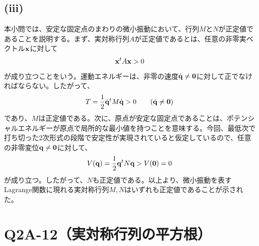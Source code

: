   
  \subsection*{(iii)}
  本小問では、安定な固定点のまわりの微小振動において、行列$M$と$N$が正定値であることを説明する。まず、実対称行列$A$が正定値であるとは、任意の非零実ベクトル$\boldsymbol{\mathrm{x}}$に対して
  \begin{align*}
    \boldsymbol{\mathrm{x}}^{t}A\boldsymbol{\mathrm{x}}>0
  \end{align*}
  が成り立つことをいう。運動エネルギーは、非零の速度$\dot{\boldsymbol{\mathrm{q}}}\neq\boldsymbol{\mathrm{0}}$に対して正でなければならない。したがって、
  \begin{align*}
    T=\frac{1}{2}\dot{\boldsymbol{\mathrm{q}}}^{t}M\dot{\boldsymbol{\mathrm{q}}}>0\qquad(\dot{\boldsymbol{\mathrm{q}}}\neq\boldsymbol{\mathrm{0}})
  \end{align*}
  であり、$M$は正定値である。次に、原点が安定な固定点であることは、ポテンシャルエネルギーが原点で局所的な最小値を持つことを意味する。今回、最低次で打ち切った2次形式の段階で安定性が実現されていると仮定しているので、任意の非零変位$\boldsymbol{\mathrm{q}}\neq\boldsymbol{\mathrm{0}}$に対して、
  \begin{align*}
    V(\boldsymbol{\mathrm{q}})=\frac{1}{2}\boldsymbol{\mathrm{q}}^{t}N\boldsymbol{\mathrm{q}}>V(\boldsymbol{\mathrm{0}})=0
  \end{align*}
  が成り立つ。したがって、$N$も正定値である。以上より、微小振動を表すLagrange関数に現れる実対称行列$M,N$はいずれも正定値であることが示された。
  
  \section{Q2A-12（実対称行列の平方根）}
  
